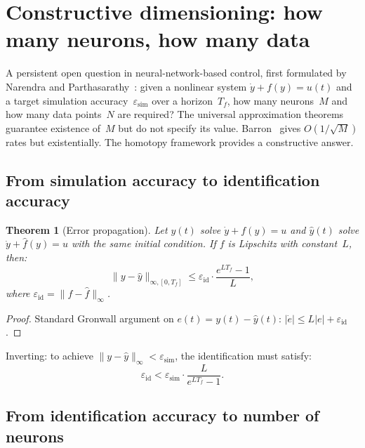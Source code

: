 \documentclass[11pt,a4paper]{article}
\newtheorem{theorem}{Theorem}
\begin{document}
\section{Constructive dimensioning: how many neurons, how many data}
\label{sec:dimensioning}

A persistent open question in neural-network-based control, first formulated by Narendra and Parthasarathy~\cite{Narendra1990}: given a nonlinear system $\dot{y} + f(y) = u(t)$ and a target simulation accuracy~$\varepsilon_{\mathrm{sim}}$ over a horizon~$T_f$, how many neurons~$M$ and how many data points~$N$ are required? The universal approximation theorems~\cite{Cybenko1989,Hornik1991} guarantee existence of~$M$ but do not specify its value. Barron~\cite{Barron1993} gives $O(1/\sqrt{M})$ rates but existentially. The homotopy framework provides a constructive answer.

\subsection{From simulation accuracy to identification accuracy}

\begin{theorem}[Error propagation]\label{thm:propagation}
Let $y(t)$ solve $\dot{y} + f(y) = u$ and $\hat{y}(t)$ solve $\dot{y} + \hat{f}(y) = u$ with the same initial condition. If $f$ is Lipschitz with constant~$L$, then:
\begin{equation}
\|y - \hat{y}\|_{\infty,[0,T_f]} \leq \varepsilon_{\mathrm{id}} \cdot \frac{e^{L T_f} - 1}{L},
\label{eq:gronwall}
\end{equation}
where $\varepsilon_{\mathrm{id}} = \|f - \hat{f}\|_\infty$.
\end{theorem}
\begin{proof}
Standard Gronwall argument on $e(t) = y(t) - \hat{y}(t)$: $|\dot{e}| \leq L|e| + \varepsilon_{\mathrm{id}}$.
\end{proof}

Inverting: to achieve $\|y - \hat{y}\|_\infty < \varepsilon_{\mathrm{sim}}$, the identification must satisfy:
\begin{equation}
\varepsilon_{\mathrm{id}} < \varepsilon_{\mathrm{sim}} \cdot \frac{L}{e^{L T_f} - 1}.
\label{eq:eps-id-required}
\end{equation}

\subsection{From identification accuracy to number of neurons}
\end{document}
